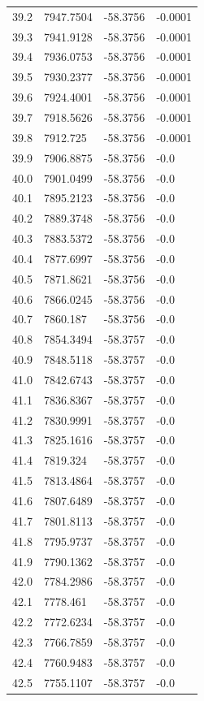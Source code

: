 \begin{table}[H]
\begin{tabular}{llll}
39.2 & 7947.7504 & -58.3756 & -0.0001 \\
39.3 & 7941.9128 & -58.3756 & -0.0001 \\
39.4 & 7936.0753 & -58.3756 & -0.0001 \\
39.5 & 7930.2377 & -58.3756 & -0.0001 \\
39.6 & 7924.4001 & -58.3756 & -0.0001 \\
39.7 & 7918.5626 & -58.3756 & -0.0001 \\
39.8 & 7912.725 & -58.3756 & -0.0001 \\
39.9 & 7906.8875 & -58.3756 & -0.0 \\
40.0 & 7901.0499 & -58.3756 & -0.0 \\
40.1 & 7895.2123 & -58.3756 & -0.0 \\
40.2 & 7889.3748 & -58.3756 & -0.0 \\
40.3 & 7883.5372 & -58.3756 & -0.0 \\
40.4 & 7877.6997 & -58.3756 & -0.0 \\
40.5 & 7871.8621 & -58.3756 & -0.0 \\
40.6 & 7866.0245 & -58.3756 & -0.0 \\
40.7 & 7860.187 & -58.3756 & -0.0 \\
40.8 & 7854.3494 & -58.3757 & -0.0 \\
40.9 & 7848.5118 & -58.3757 & -0.0 \\
41.0 & 7842.6743 & -58.3757 & -0.0 \\
41.1 & 7836.8367 & -58.3757 & -0.0 \\
41.2 & 7830.9991 & -58.3757 & -0.0 \\
41.3 & 7825.1616 & -58.3757 & -0.0 \\
41.4 & 7819.324 & -58.3757 & -0.0 \\
41.5 & 7813.4864 & -58.3757 & -0.0 \\
41.6 & 7807.6489 & -58.3757 & -0.0 \\
41.7 & 7801.8113 & -58.3757 & -0.0 \\
41.8 & 7795.9737 & -58.3757 & -0.0 \\
41.9 & 7790.1362 & -58.3757 & -0.0 \\
42.0 & 7784.2986 & -58.3757 & -0.0 \\
42.1 & 7778.461 & -58.3757 & -0.0 \\
42.2 & 7772.6234 & -58.3757 & -0.0 \\
42.3 & 7766.7859 & -58.3757 & -0.0 \\
42.4 & 7760.9483 & -58.3757 & -0.0 \\
42.5 & 7755.1107 & -58.3757 & -0.0 \\

\end{tabular}
\end{table}
